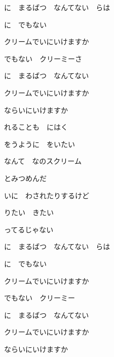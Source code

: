 \documentclass[a4paper,tate,twocolumn,12pt]{ltjtarticle}
\begin{document}
\begin{flushleft}
\vspace{2em}

\noindent\begin{minipage}{\linewidth}
に　まるばつ　なんてない　らは

に　でもない

クリームでいにいけますか

でもない　クリーミーさ

に　まるばつ　なんてない

クリームでいにいけますか

ならいにいけますか
\end{minipage}

\vspace{2em}

\noindent\begin{minipage}{\linewidth}
れることも　にはく

をうように　をいたい

なんて　なのスクリーム

とみつめんだ

いに　わされたりするけど

りたい　きたい

ってるじゃない
\end{minipage}

\vspace{2em}

\noindent\begin{minipage}{\linewidth}
に　まるばつ　なんてない　らは

に　でもない

クリームでいにいけますか

でもない　クリーミー

に　まるばつ　なんてない

クリームでいにいけますか

ならいにいけますか
\end{minipage}


\end{flushleft}
\end{document}
